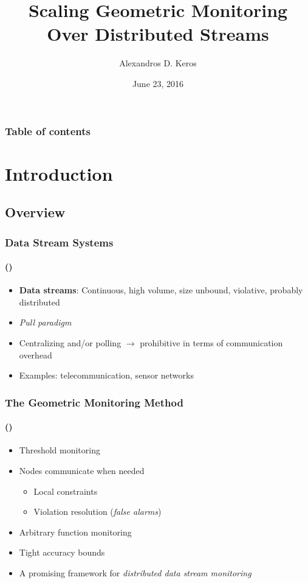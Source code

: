 \documentclass[hyperref={pdfpagelabels=false}]{beamer}
\title{Scaling Geometric Monitoring Over Distributed Streams}
\author{Alexandros D. Keros}
\date{June 23, 2016}
\begin{document}
\begin{frame}
\titlepage
\end{frame} 


\begin{frame}
\frametitle{Table of contents}
\tableofcontents
\end{frame} 

\section{Introduction}
\begin{frame}
  \tableofcontents[currentsection]
 \end{frame}
 
\subsection*{Overview}
\begin{frame} \frametitle{Data Stream Systems}\framesubtitle{\tiny()}
\begin{itemize}
\item \textbf{Data streams}: Continuous, high volume, size unbound, violative, probably distributed
\item \emph{Pull paradigm}
\item Centralizing and/or polling $\rightarrow$ prohibitive in terms of communication overhead
\item Examples: telecommunication, sensor networks 
\end{itemize}
\end{frame}

\begin{frame} \frametitle{The Geometric Monitoring Method}\framesubtitle{\tiny()}
\begin{itemize}
\item Threshold monitoring
\item Nodes communicate when needed
	\begin{itemize}
	\item Local constraints
	\item Violation resolution (\emph{false alarms})
	\end{itemize}
\item Arbitrary function monitoring
\item Tight accuracy bounds
\item A promising framework for \emph{distributed data stream monitoring}
\end{itemize}
\end{frame}
\end{document}
